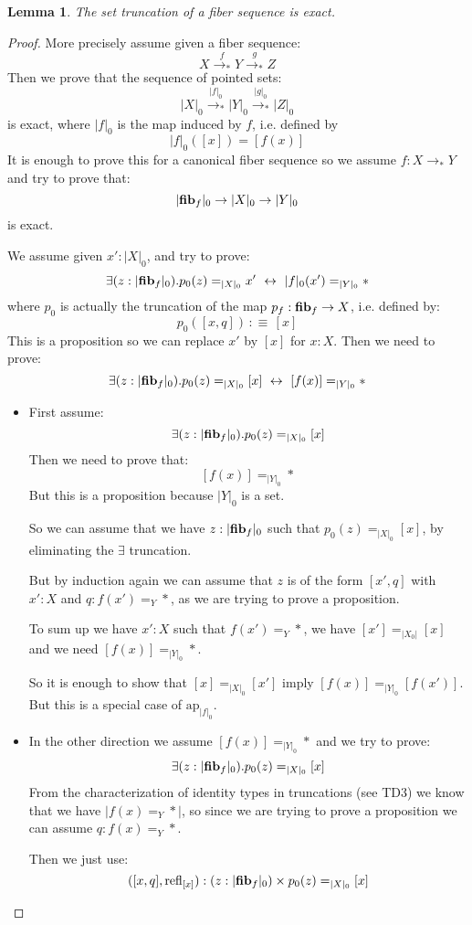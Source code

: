 \documentclass{article}
\renewcommand{\r}{\rightarrow}
\newcommand{\ap}{\mathrm{ap}}
\newcommand{\refl}{\mathrm{refl}}
\newcommand{\fib}{\mathrm{\bf fib}}
\newtheorem{lemma}{Lemma}
\begin{document}
\begin{lemma}
The set truncation of a fiber sequence is exact.
\end{lemma}
\begin{proof}
More precisely assume given a fiber sequence:
\[X \overset{f}{\r_*} Y\overset{g}{\r_*} Z\] 
Then we prove that the sequence of pointed sets:
\[|X|_0\overset{|f|_0}{\r_*} |Y|_0\overset{|g|_0}{\r_*} |Z|_0\] 
is exact, where $|f|_0$ is the map induced by $f$, i.e. defined by 
\[|f|_0([x]) = [f(x)]\] 
It is enough to prove this for a canonical fiber sequence so we assume $f:X\r_* Y$ and try to prove that:
\[|\fib_f|_0 \r |X|_0\r |Y|_0\]
is exact.

We assume given $x':|X|_0$, and try to prove:
\[\exists (z:|\fib_f|_0).p_0(z) =_{|X|_0} x' \ \leftrightarrow\ |f|_0(x') =_{|Y|_0} *\]
where $p_0$ is actually the truncation of the map $p_f:\fib_f\r X$, i.e. defined by: 
\[p_0([x,q]) \, :\equiv\, [x]\] 
This is a proposition so we can replace $x'$ by $[x]$ for $x:X$. Then we need to prove:
\[\exists (z:|\fib_f|_0).p_0(z) =_{|X|_0} [x] \ \leftrightarrow\ [f(x)] =_{|Y|_0} *\]

\begin{itemize}
\item First assume: 
\[\exists (z:|\fib_f|_0).p_0(z) =_{|X|_0} [x]\]
Then we need to prove that:
\[[f(x)] =_{|Y|_0} *\]
But this is a proposition because $|Y|_0$ is a set. 

So we can assume that we have $z:|\fib_f|_0$ such that $p_0(z)=_{|X|_0} [x]$, by eliminating the $\exists$ truncation.

But by induction again we can assume that $z$ is of the form $[x',q]$ with $x':X$ and $q:f(x')=_Y*$, as we are trying to prove a proposition.

To sum up we have $x':X$ such that $f(x') =_Y *$, we have $[x']=_{|X_0|}[x]$ and we need $[f(x)] =_{|Y|_0} *$.

So it is enough to show that $[x]=_{|X|_0}[x']$ imply $[f(x)]=_{|Y|_0} [f(x')]$. But this is a special case of $\ap_{|f|_0}$.

\item In the other direction we assume $[f(x)] =_{|Y|_0} *$ and we try to prove:
\[\exists (z:|\fib_f|_0).p_0(z) =_{|X|_0} [x]\]
From the characterization of identity types in truncations (see TD3) we know that we have $|f(x)=_Y*|$, so since we are trying to prove a proposition we can assume $q:f(x)=_Y*$.

Then we just use:
\[([x,q],\refl_{[x]}) : (z:|\fib_f|_0)\times p_0(z)=_{|X|_0} [x]\] 
\end{itemize}
\end{proof}
\end{document}
